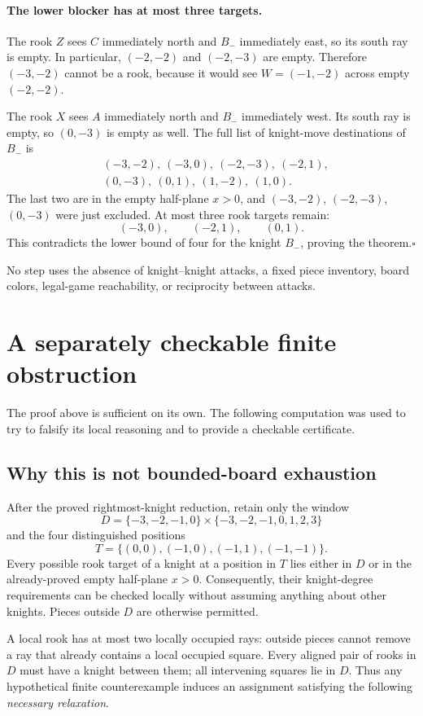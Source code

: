 \documentclass[11pt]{article}
\begin{document}
\paragraph{The lower blocker has at most three targets.}
The rook \(Z\) sees \(C\) immediately north and \(B_-\) immediately east,
so its south ray is empty. In particular, \((-2,-2)\) and \((-2,-3)\)
are empty. Therefore \((-3,-2)\) cannot be a rook, because it would see
\(W=(-1,-2)\) across empty \((-2,-2)\).

The rook \(X\) sees \(A\) immediately north and \(B_-\) immediately west.
Its south ray is empty, so \((0,-3)\) is empty as well. The full list of
knight-move destinations of \(B_-\) is
\[
\begin{split}
&(-3,-2),\ (-3,0),\ (-2,-3),\ (-2,1),\\
&(0,-3),\ (0,1),\ (1,-2),\ (1,0).
\end{split}
\]
The last two are in the empty half-plane \(x>0\), and \((-3,-2)\),
\((-2,-3)\), \((0,-3)\) were just excluded. At most three rook targets
remain:
\[
(-3,0),\qquad(-2,1),\qquad(0,1).
\]
This contradicts the lower bound of four for the knight \(B_-\), proving
the theorem.\hfill\(\square\)

No step uses the absence of knight--knight attacks, a fixed piece inventory,
board colors, legal-game reachability, or reciprocity between attacks.

\section{A separately checkable finite obstruction}
The proof above is sufficient on its own. The following computation was
used to try to falsify its local reasoning and to provide a checkable
certificate.

\subsection{Why this is not bounded-board exhaustion}
After the proved rightmost-knight reduction, retain only the window
\[
D=\{-3,-2,-1,0\}\times\{-3,-2,-1,0,1,2,3\}
\]
and the four distinguished positions
\[
T=\{(0,0),(-1,0),(-1,1),(-1,-1)\}.
\]
Every possible rook target of a knight at a position in \(T\) lies either
in \(D\) or in the already-proved empty half-plane \(x>0\). Consequently,
their knight-degree requirements can be checked locally without assuming
anything about other knights. Pieces outside \(D\) are otherwise permitted.

A local rook has at most two locally occupied rays: outside pieces cannot
remove a ray that already contains a local occupied square. Every aligned
pair of rooks in \(D\) must have a knight between them; all intervening
squares lie in \(D\). Thus any hypothetical finite counterexample induces
an assignment satisfying the following \emph{necessary relaxation}.
\end{document}
